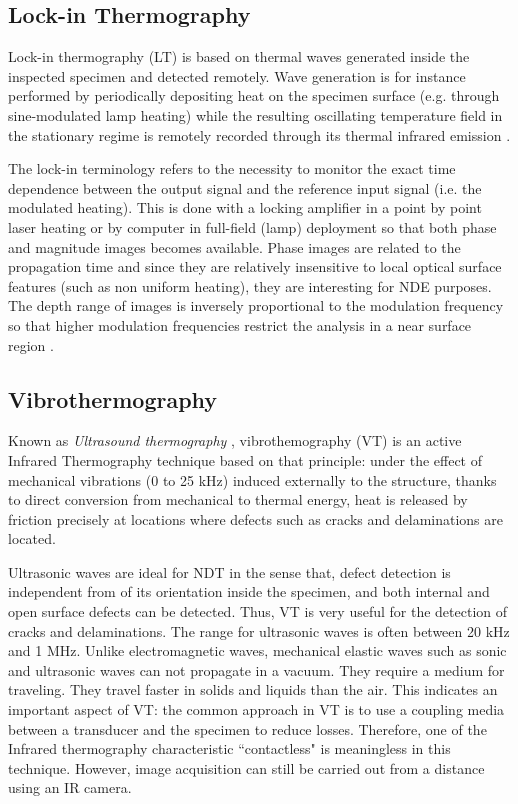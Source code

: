 \subsection{Lock-in Thermography}
Lock-in thermography (LT) is based on thermal waves generated inside the inspected specimen and detected remotely. Wave generation is for instance performed by periodically depositing heat on the specimen surface (e.g. through sine-modulated lamp heating) while the resulting oscillating temperature field in the stationary regime is remotely recorded through its thermal infrared emission \citep{wu1998lock}.

The lock-in terminology refers to the necessity to monitor the exact time dependence between the output signal and the reference input signal (i.e. the modulated heating). This is done with a locking amplifier in a point by point laser heating or by computer in full-field (lamp) deployment so that both phase and magnitude images becomes available. Phase images are related to the propagation time and since they are relatively insensitive to local optical surface features (such as non uniform heating), they are interesting for NDE purposes. The depth range of images is inversely proportional to the modulation frequency so that higher modulation frequencies restrict the analysis in a near surface region \citep{Maldague2001theory}.

\subsection{Vibrothermography}
Known as \textit{Ultrasound thermography} \citep{dillenz2001progress}, vibrothemography (VT) is an active Infrared Thermography technique based on that principle: under the effect of mechanical vibrations (0 to 25 kHz) induced externally to the structure, thanks to direct conversion from mechanical to thermal energy, heat is released by friction precisely at locations where defects such as cracks and delaminations are located.

Ultrasonic waves are ideal for NDT in the sense that, defect detection is independent from of its orientation inside the specimen, and both internal and open surface defects can be detected. Thus, VT is very useful for the detection of cracks and delaminations. The range for ultrasonic waves is often between 20 kHz and 1 MHz. Unlike electromagnetic waves, mechanical elastic waves such as sonic and ultrasonic waves can not propagate in a vacuum. They require a medium for traveling. They travel faster in solids and liquids than the air. This indicates an important aspect of VT: the common approach in VT is to use a coupling media between a transducer and the specimen to reduce losses. Therefore, one of the Infrared thermography characteristic ``contactless" is meaningless in this technique. However, image acquisition can still be carried out from a distance using an IR camera.

